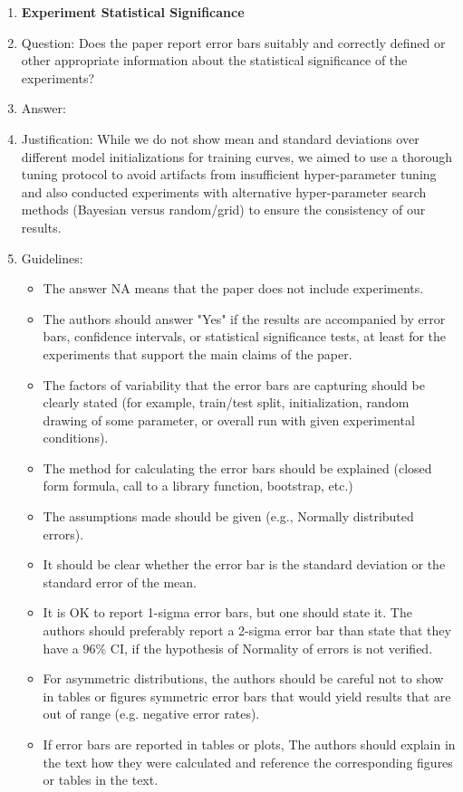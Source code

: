 \begin{enumerate}
\item {\bf Experiment Statistical Significance}
\item[] Question: Does the paper report error bars suitably and correctly defined or other appropriate information about the statistical significance of the experiments?
\item[] Answer: \answerYes{}
\item[] Justification: While we do not show mean and standard deviations over different model initializations for training curves, we aimed to use a thorough tuning protocol to avoid artifacts from insufficient hyper-parameter tuning and also conducted experiments with alternative hyper-parameter search methods (Bayesian versus random/grid) to ensure the consistency of our results.
\item[] Guidelines:
  \begin{itemize}
  \item The answer NA means that the paper does not include experiments.
  \item The authors should answer "Yes" if the results are accompanied by error bars, confidence intervals, or statistical significance tests, at least for the experiments that support the main claims of the paper.
  \item The factors of variability that the error bars are capturing should be clearly stated (for example, train/test split, initialization, random drawing of some parameter, or overall run with given experimental conditions).
  \item The method for calculating the error bars should be explained (closed form formula, call to a library function, bootstrap, etc.)
  \item The assumptions made should be given (e.g., Normally distributed errors).
  \item It should be clear whether the error bar is the standard deviation or the standard error of the mean.
  \item It is OK to report 1-sigma error bars, but one should state it. The authors should preferably report a 2-sigma error bar than state that they have a 96\% CI, if the hypothesis of Normality of errors is not verified.
  \item For asymmetric distributions, the authors should be careful not to show in tables or figures symmetric error bars that would yield results that are out of range (e.g. negative error rates).
  \item If error bars are reported in tables or plots, The authors should explain in the text how they were calculated and reference the corresponding figures or tables in the text.
  \end{itemize}


\end{enumerate}
